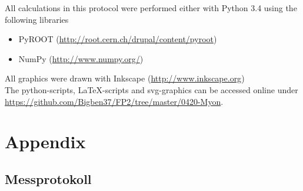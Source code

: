 \documentclass[12pt, a4paper]{scrartcl}
\title{\exptitle}
\subtitle{Fortgeschrittenen-Praktikum 1}
\author{Moritz Bitterling und Benjamin Rottler \\ Universität Freiburg}
\date{\expdate}
\numberwithin{equation}{section} %
\numberwithin{table}{section}    %
\begin{document}
\hypersetup{pageanchor=false} %

\thispagestyle{empty}

\newpage
All calculations in this protocol were performed either with Python 3.4 using the following libraries
\begin{itemize}
  \item PyROOT (\url{http://root.cern.ch/drupal/content/pyroot})
  \item NumPy (\url{http://www.numpy.org/})
\end{itemize}
All graphics were drawn with Inkscape (\url{http://www.inkscape.org})\\[\baselineskip]
The python-scripts, \LaTeX-scripts and svg-graphics can be accessed online under
\url{https://github.com/Bigben37/FP2/tree/master/0420-Myon}.
\thispagestyle{empty}

\newpage
\tableofcontents
\thispagestyle{empty}

\newpage
\hypersetup{pageanchor=true} %
\setcounter{page}{1} %

 





\newpage



\appendix
\section{Appendix}
\subsection{Messprotokoll}

\end{document}
